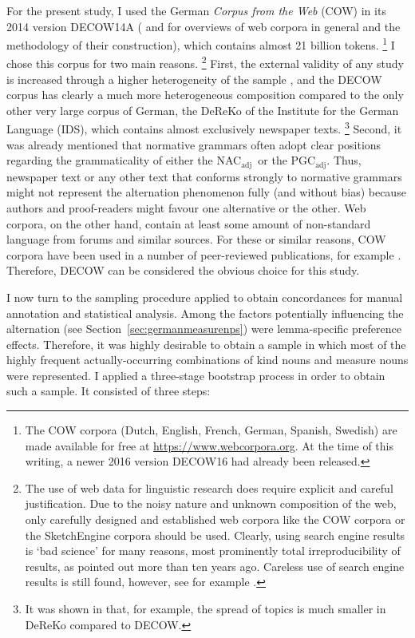 \documentclass[USenglish]{article}
\newcommand{\Sub}[1]{\ensuremath{\mathrm{_{#1}}}}
\newcommand{\NACa}{NAC\Sub{adj}}
\newcommand{\PGCa}{PGC\Sub{adj}}
\begin{document}
For the present study, I used the German \textit{Corpus from the Web} (COW) in its 2014 version DECOW14A (\citealp{SchaeferBildhauer2012full,Schaefer2015b} and \citealp{BiemannEa2013,SchaeferBildhauer2013} for overviews of web corpora in general and the methodology of their construction), which contains almost 21 billion tokens.%
\footnote{The COW corpora (Dutch, English, French, German, Spanish, Swedish) are made available for free at \url{https://www.webcorpora.org}.
At the time of this writing, a newer 2016 version DECOW16 had already been released.}
I chose this corpus for two main reasons.%
\footnote{The use of web data for linguistic research does require explicit and careful justification.
Due to the noisy nature and unknown composition of the web, only carefully designed and established web corpora like the COW corpora or the SketchEngine corpora \citep{KilgarriffEa2014} should be used.
Clearly, using search engine results is `bad science' for many reasons, most prominently total irreproducibility of results, as \cite{Kilgarriff2006} pointed out more than ten years ago.
Careless use of search engine results is still found, however, see for example \citet[171--175]{DeclerckBrems2016}.}
First, the external validity of any study is increased through a higher heterogeneity of the sample \citep[30]{MaxwellDelaney2004}, and the DECOW corpus has clearly a much more heterogeneous composition compared to the only other very large corpus of German, the DeReKo \citep{KupietzEa2010} of the Institute for the German Language (IDS), which contains almost exclusively newspaper texts.%
\footnote{It was shown in \cite{W16-2601} that, for example, the spread of topics is much smaller in DeReKo compared to DECOW.}
Second, it was already mentioned that normative grammars often adopt clear positions regarding the grammaticality of either the \NACa\ or the \PGCa.
Thus, newspaper text or any other text that conforms strongly to normative grammars might not represent the alternation phenomenon fully (and without bias) because authors and proof-readers might favour one alternative or the other.
Web corpora, on the other hand, contain at least some amount of non-standard language from forums and similar sources.
For these or similar reasons, COW corpora have been used in a number of peer-reviewed publications, for example \cite{VanGoethemHiligsmann2014,VanGoethemHuening2015,MuellerS2014,Schaefer2016c,SchaeferSayatz2014,SchaeferSayatz2016,Zimmer2015}. 
Therefore, DECOW can be considered the obvious choice for this study.

I now turn to the sampling procedure applied to obtain concordances for manual annotation and statistical analysis.
Among the factors potentially influencing the alternation (see Section~\ref{sec:germanmeasurenps}) were lemma-specific preference effects.
Therefore, it was highly desirable to obtain a sample in which most of the highly frequent actually-occurring combinations of kind nouns and measure nouns were represented.
I applied a three-stage bootstrap process in order to obtain such a sample.
It consisted of three steps:
\end{document}
